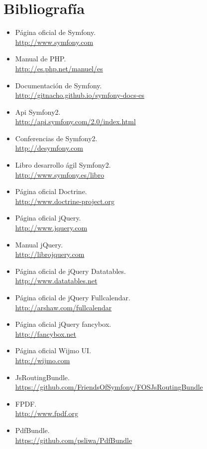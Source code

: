 \documentclass[a4paper,12pt]{article}
\begin{document}
\section{\fontsize{12}{1}\selectfont Bibliografía}
\begin{itemize}
\item Página oficial de Symfony. \\\url{http://www.symfony.com}
\item Manual de PHP. \\\url{http://es.php.net/manuel/es}
\item Documentación de Symfony. \\\url{http://gitnacho.github.io/symfony-docs-es}
\item Api Symfony2. \\\url{http://api.symfony.com/2.0/index.html}
\item Conferencias de Symfony2. \\\url{http://desymfony.com}
\item Libro desarrollo ágil Symfony2. \\\url{http://www.symfony.es/libro}
\item Página oficial Doctrine. \\\url{http://www.doctrine-project.org}
\item Página oficial jQuery. \\\url{http://www.jquery.com}
\item Manual jQuery. \\\url{http://librojquery.com}
\item Página oficial de jQuery Datatables. \\\url{http://www.datatables.net}
\item Página oficial de jQuery Fullcalendar. \\\url{http://arshaw.com/fullcalendar}
\item Página oficial jQuery fancybox. \\\url{http://fancybox.net}
\item Página oficial Wijmo UI. \\\url{http://wijmo.com}
\item JsRoutingBundle. \\\url{https://github.com/FriendsOfSymfony/FOSJsRoutingBundle}
\item FPDF. \\\url{http://www.fpdf.org}
\item PdfBundle. \\\url{https://github.com/psliwa/PdfBundle}

\end{itemize}
\end{document}
